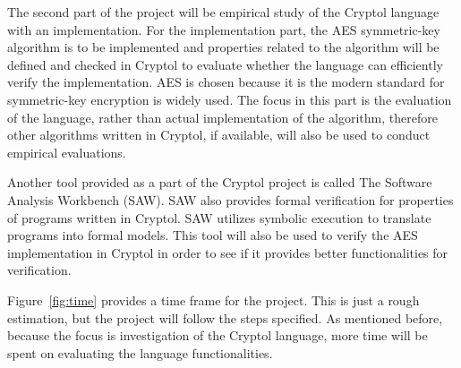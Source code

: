 \documentclass[a4paper, notitlepage]{report}
\begin{document}
The second part of the project will be empirical study of the Cryptol language
with an implementation.
For the implementation part, the AES symmetric-key algorithm
\cite{standard2001announcing, bertoni2002efficient} is to be implemented
 and properties related to the algorithm will be defined and checked
in Cryptol to evaluate whether the language can efficiently verify
the implementation. AES is chosen because it is the modern standard
for symmetric-key encryption is widely used. 
The focus in this part is the evaluation of the language,
rather than actual implementation of the algorithm, therefore other
algorithms written in Cryptol, if available, will
also be used to conduct empirical evaluations.

Another tool provided as a part of the Cryptol project is called
The Software Analysis Workbench (SAW). SAW also provides formal verification
for properties of programs written in Cryptol.
SAW utilizes symbolic execution to translate programs into formal models.
This tool will also be used to verify the AES implementation in Cryptol
in order to see if it provides better functionalities for verification.

Figure~\ref{fig:time} provides a time frame for the project. This is just
a rough estimation, but the project will follow the steps specified.
As mentioned before, because the focus is investigation
of the Cryptol language, more time will be spent on evaluating the language
functionalities. 




\newpage



\end{document}
